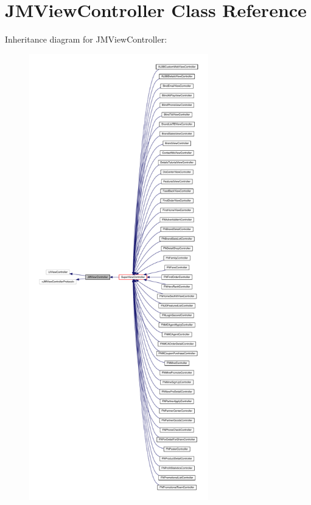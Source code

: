 \hypertarget{interface_j_m_view_controller}{}\section{J\+M\+View\+Controller Class Reference}
\label{interface_j_m_view_controller}


Inheritance diagram for J\+M\+View\+Controller\+:\nopagebreak
\begin{figure}[H]
\begin{center}
\leavevmode
\includegraphics[height=550pt]{interface_j_m_view_controller__inherit__graph}
\end{center}
\end{figure}



